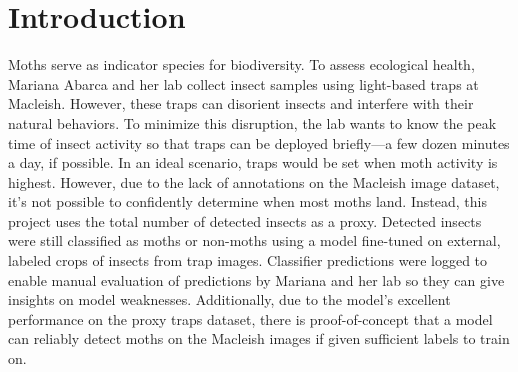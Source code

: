 \documentclass[twocolumn]{article}
\newcommand\tab[1][1cm]{\hspace*{#1}}
\begin{document}
\section{Introduction}
    \tab Moths serve as indicator species for biodiversity. To assess ecological health, 
    Mariana Abarca and her lab collect insect samples using light-based traps at Macleish. 
    However, these traps can disorient insects and interfere with their natural behaviors. 
    To minimize this disruption, the lab wants to know the peak time of insect activity 
    so that traps can be deployed briefly—a few dozen minutes a day, if possible. \newline
    \tab In an ideal scenario, traps would be set when moth activity is highest. However, due to the 
    lack of annotations on the Macleish image dataset, it's not possible to confidently determine 
    when most moths land. Instead, this project uses the total number of detected insects 
    as a proxy.  Detected insects were still classified as moths or non-moths using a model fine-tuned on 
    external, 
    labeled crops of insects from trap images.  Classifier predictions were logged to enable manual evaluation 
    of predictions by Mariana and her lab so they can give insights on model weaknesses.
    Additionally, due to the model's excellent performance on the proxy traps dataset,
    there is proof-of-concept that a model can reliably detect moths 
    on the Macleish images if given sufficient labels to train on.
    \newline
\end{document}

